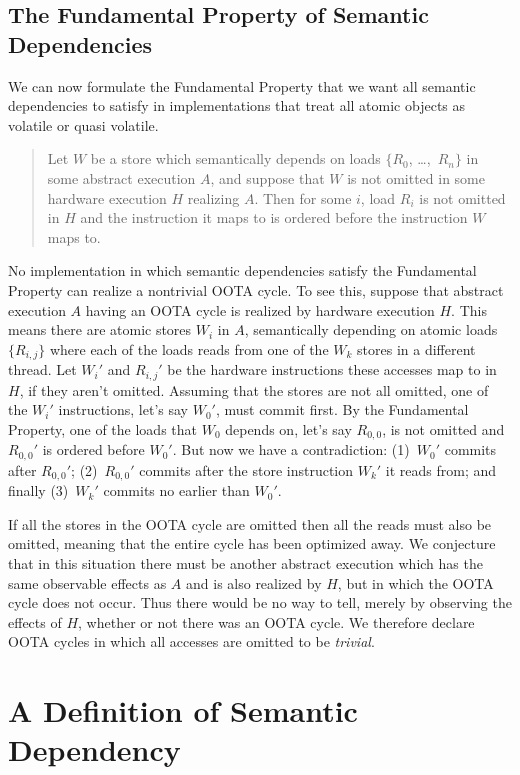 \subsection{The Fundamental Property of Semantic Dependencies}
\label{sec:The Fundamental Property of Semantic Dependencies}

We can now formulate the Fundamental Property that we want all semantic
dependencies to satisfy in implementations that treat all atomic objects
as volatile or quasi volatile.
\begin{quote}
Let $W$ be a store which semantically depends on loads
$\{R_0$, \ldots,~$R_n\}$ in some abstract execution $A$,
and suppose that $W$ is not
omitted in some hardware execution $H$ realizing $A$.
Then for some $i$, load $R_i$ is not omitted in $H$ and the
instruction it maps to is ordered before the instruction $W$ maps to.
\end{quote}

No implementation in which semantic dependencies satisfy the Fundamental
Property can realize a nontrivial OOTA cycle.
To see this, suppose that abstract execution $A$ having an OOTA cycle
is realized by hardware execution $H$.
This means there are atomic stores $W_i$ in $A$,
semantically depending on atomic loads
$\{R_{i,j}\}$ where each of the loads reads from one of the $W_k$
stores in a different thread.
Let $W_i'$ and $R_{i,j}'$ be the hardware instructions these accesses
map to in $H$, if they aren't omitted.
Assuming that the stores are not all omitted,
one of the $W_i'$ instructions, let's say $W_0'$, must commit first.
By the Fundamental Property, one of the loads that $W_0$ depends on,
let's say $R_{0,0}$, is not omitted and $R_{0,0}'$ is ordered before $W_0'$.
But now we have a contradiction:
(1)~$W_0'$ commits after $R_{0,0}'$;
(2)~$R_{0,0}'$ commits after the store instruction $W_k'$ it reads from;
and finally
(3)~$W_k'$ commits no earlier than $W_0'$.

If all the stores in the OOTA cycle are omitted then all the reads must
also be omitted, meaning that the entire cycle has been optimized away.
We conjecture that in this situation there must be another abstract
execution which has the same observable effects as $A$ and is also
realized by $H$, but in which the OOTA cycle does not occur.
Thus there would be no way to tell, merely by observing the effects of
$H$, whether or not there was an OOTA cycle.
We therefore declare OOTA cycles in which all accesses are omitted to
be \emph{trivial}.

\section{A Definition of Semantic Dependency}
\label{sec:A Definition of Semantic Dependency}

